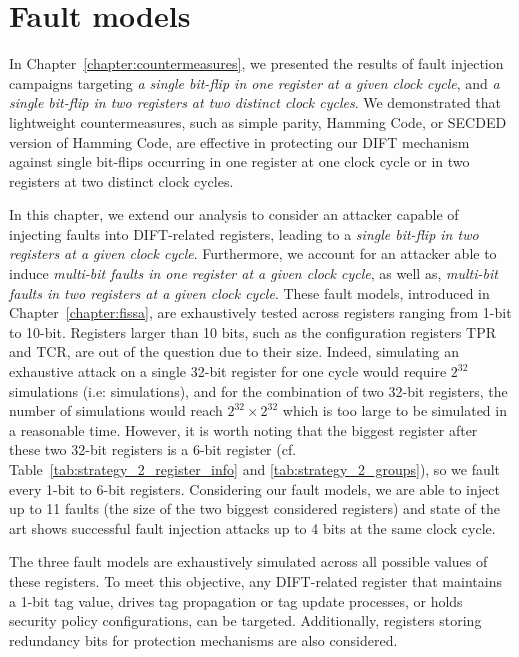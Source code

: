 \section{Fault models}
\label{section:chap6_faultmodels}
In Chapter~\ref{chapter:countermeasures}, we presented the results of fault injection campaigns targeting \textit{a single bit-flip in one register at a given clock cycle}, and \textit{a single bit-flip in two registers at two distinct clock cycles}. We demonstrated that lightweight countermeasures, such as simple parity, Hamming Code, or SECDED version of Hamming Code, are effective in protecting our DIFT mechanism against single bit-flips occurring in one register at one clock cycle or in two registers at two distinct clock cycles.

In this chapter, we extend our analysis to consider an attacker capable of injecting faults into DIFT-related registers, leading to a \textit{single bit-flip in two registers at a given clock cycle}. Furthermore, we account for an attacker able to induce \textit{multi-bit faults in one register at a given clock cycle}, as well as, \textit{multi-bit faults in two registers at a given clock cycle}. These fault models, introduced in Chapter~\ref{chapter:fissa}, are exhaustively tested across registers ranging from 1-bit to 10-bit. Registers larger than 10 bits, such as the configuration registers TPR and TCR, are out of the question due to their size. Indeed, simulating an exhaustive attack on a single 32-bit register for one cycle would require $2^{32}$ simulations (i.e:  simulations), and for the combination of two 32-bit registers, the number of simulations would reach $2^{32} \times 2^{32}$ which is too large to be simulated in a reasonable time. However, it is worth noting that the biggest register after these two 32-bit registers is a 6-bit register (cf. Table~\ref{tab:strategy_2_register_info} and \ref{tab:strategy_2_groups}), so we fault every 1-bit to 6-bit registers. Considering our fault models, we are able to inject up to 11 faults (the size of the two biggest considered registers) and state of the art shows successful fault injection attacks up to 4 bits at the same clock cycle.

The three fault models are exhaustively simulated across all possible values of these registers. To meet this objective, any DIFT-related register that maintains a 1-bit tag value, drives tag propagation or tag update processes, or holds security policy configurations, can be targeted. Additionally, registers storing redundancy bits for protection mechanisms are also considered.

